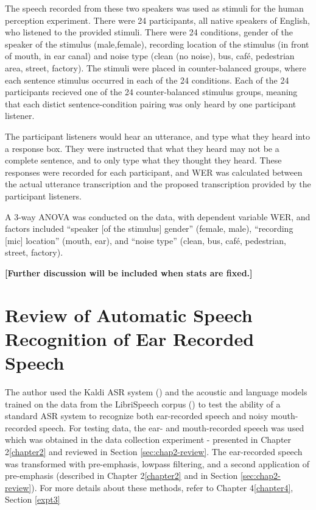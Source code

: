 The speech recorded from these two speakers was used as stimuli for the human perception experiment.  There were 24 participants, all native speakers of English, who listened to the provided stimuli.  There were 24 conditions, gender of the speaker of the stimulus (male,female), recording location of the stimulus (in front of mouth, in ear canal) and noise type (clean (no noise), bus, caf\'{e}, pedestrian area, street, factory).  The stimuli were placed in counter-balanced groups, where each sentence stimulus occurred in each of the 24 conditions.  Each of the 24 participants recieved one of the 24 counter-balanced stimulus groups, meaning that each distict sentence-condition pairing was only heard by one participant listener.

The participant listeners would hear an utterance, and type what they heard into a response box.  They were instructed that what they heard may not be a complete sentence, and to only type what they thought they heard.  These responses were recorded for each participant, and WER was calculated between the actual utterance transcription and the proposed transcription provided by the participant listeners.

A 3-way ANOVA was conducted on the data, with dependent variable WER, and factors included ``speaker [of the stimulus] gender'' (female, male), ``recording [mic] location'' (mouth, ear), and ``noise type'' (clean, bus, caf\'{e}, pedestrian, street, factory).  

\textbf{[Further discussion will be included when stats are fixed.]}



\section{Review of Automatic Speech Recognition of Ear Recorded Speech}\label{sec:chap4-review}

The author used the Kaldi ASR system (\cite{povey:11}) and the acoustic and language models trained on the data from the LibriSpeech corpus (\cite{panayotov:15}) to test the ability of a standard ASR system to recognize both ear-recorded speech and noisy mouth-recorded speech.  For testing data, the ear- and mouth-recorded speech was used which was obtained in the data collection experiment - presented in Chapter 2\ref{chapter2} and reviewed in Section \ref{sec:chap2-review}.  The ear-recorded speech was transformed with pre-emphasis, lowpass filtering, and a second application of pre-emphasis (described in Chapter 2\ref{chapter2} and in Section \ref{sec:chap2-review}). For more details about these methods, refer to Chapter 4\ref{chapter4}, Section \ref{expt3}


